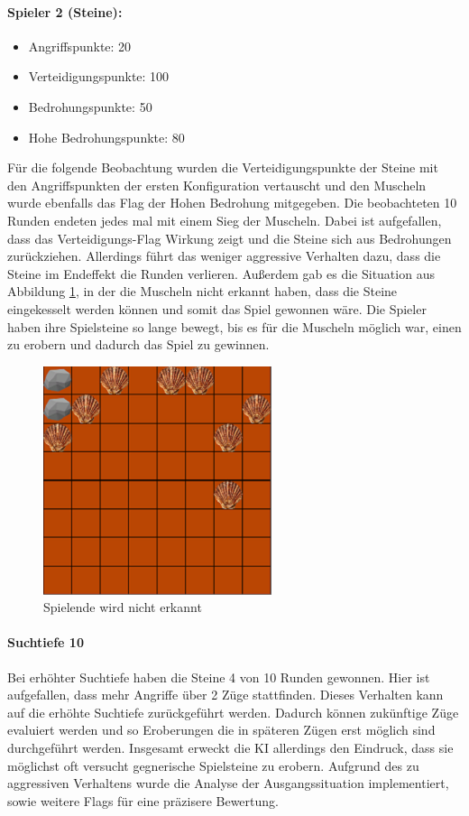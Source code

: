 \paragraph{Spieler 2 (Steine):}
\begin{itemize}
	\item Angriffspunkte: 20
	\item Verteidigungspunkte: 100
	\item Bedrohungspunkte: 50
	\item Hohe Bedrohungspunkte: 80
\end{itemize}
Für die folgende Beobachtung wurden die Verteidigungspunkte der Steine mit den Angriffspunkten der ersten Konfiguration vertauscht und den Muscheln wurde ebenfalls das Flag der Hohen Bedrohung mitgegeben. Die beobachteten 10 Runden endeten jedes mal mit einem Sieg der Muscheln. Dabei ist aufgefallen, dass das Verteidigungs-Flag Wirkung zeigt und die Steine sich aus Bedrohungen zurückziehen. Allerdings führt das weniger aggressive Verhalten dazu, dass die Steine im Endeffekt die Runden verlieren. Außerdem gab es die Situation aus Abbildung \ref{fig:nicht erkannt}, in der die Muscheln nicht erkannt haben, dass die Steine eingekesselt werden können und somit das Spiel gewonnen wäre. Die Spieler haben ihre Spielsteine so lange bewegt, bis es für die Muscheln möglich war, einen zu erobern und dadurch das Spiel zu gewinnen.
\begin{figure}[h]
	\centering
	\includegraphics{img/einkesselnHidezuhoch2}
	\caption{Spielende wird nicht erkannt}
	\label{fig:nicht erkannt}
\end{figure}
\paragraph{Suchtiefe 10}
Bei erhöhter Suchtiefe haben die Steine 4 von 10 Runden gewonnen. Hier ist aufgefallen, dass mehr Angriffe über 2 Züge stattfinden. Dieses Verhalten kann auf die erhöhte Suchtiefe zurückgeführt werden. Dadurch können zukünftige Züge evaluiert werden und so Eroberungen die in späteren Zügen erst möglich sind durchgeführt werden. Insgesamt erweckt die KI allerdings den Eindruck, dass sie möglichst oft versucht gegnerische Spielsteine zu erobern. Aufgrund des zu aggressiven Verhaltens wurde die Analyse der Ausgangssituation implementiert, sowie weitere Flags für eine präzisere Bewertung.

